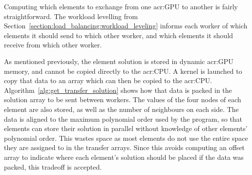 Computing which elements to exchange from one \acrshort{acr:GPU} to another is fairly
straightforward. The workload levelling from Section~\ref{section:load_balancing:workload_leveling}
informs each worker of which elements it should send to which other worker, and which elements it
should receive from which other worker. 

As mentioned previously, the element solution is stored in dynamic \acrshort{acr:GPU} memory, and
cannot be copied directly to the \acrshort{acr:CPU}. A kernel is launched to copy that data to an
array which can then be copied to the \acrshort{acr:CPU}. Algorithm~\ref{alg:get_transfer_solution}
shows how that data is packed in the solution array to be sent between workers. The values of the
four nodes of each element are also stored, as well as the number of neighbours on each side. The
data is aligned to the maximum polynomial order used by the program, so that elements can store
their solution in parallel without knowledge of other elements' polynomial order. This wastes space
as most elements do not use the entire space they are assigned to in the transfer arrays. Since this
avoids computing an offset array to indicate where each element's solution should be placed if the
data was packed, this tradeoff is accepted.

